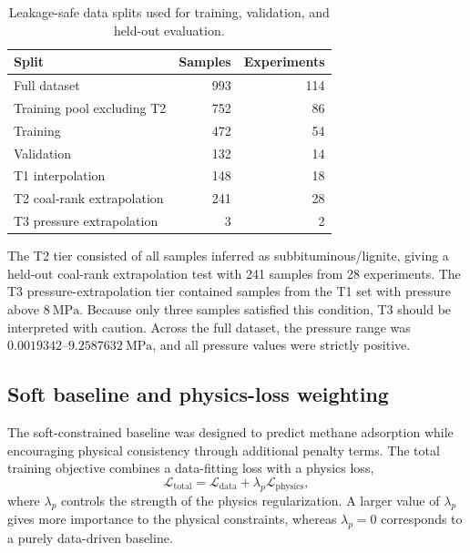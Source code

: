 \documentclass[11pt]{article}
\begin{document}
\begin{table}[htbp]
    \centering
    \begin{tabular}{lrr}
        \toprule
        \textbf{Split}             & \textbf{Samples} & \textbf{Experiments} \\
        \midrule
        Full dataset               & 993              & 114                  \\
        Training pool excluding T2 & 752              & 86                   \\
        Training                   & 472              & 54                   \\
        Validation                 & 132              & 14                   \\
        T1 interpolation           & 148              & 18                   \\
        T2 coal-rank extrapolation & 241              & 28                   \\
        T3 pressure extrapolation  & 3                & 2                    \\
        \bottomrule
    \end{tabular}
    \caption{Leakage-safe data splits used for training, validation, and
        held-out evaluation.}
    \label{tab:data-splits}
\end{table}

The T2 tier consisted of all samples inferred as subbituminous/lignite, giving
a held-out coal-rank extrapolation test with 241 samples from 28 experiments.
The T3 pressure-extrapolation tier contained samples from the T1 set with
pressure above \(8~\mathrm{MPa}\). Because only three samples satisfied this
condition, T3 should be interpreted with caution. Across the full dataset, the
pressure range was
\(0.0019342\)--\(9.2587632~\mathrm{MPa}\), and all pressure values were
strictly positive.

\subsection{Soft baseline and physics-loss weighting}

The soft-constrained baseline was designed to predict methane adsorption while
encouraging physical consistency through additional penalty terms. The total
training objective combines a data-fitting loss with a physics loss,
\[
    \mathcal{L}_{\mathrm{total}}
    =
    \mathcal{L}_{\mathrm{data}}
    +
    \lambda_p \mathcal{L}_{\mathrm{physics}},
\]
where \(\lambda_p\) controls the strength of the physics regularization. A
larger value of \(\lambda_p\) gives more importance to the physical constraints,
whereas \(\lambda_p=0\) corresponds to a purely data-driven baseline.
\end{document}
